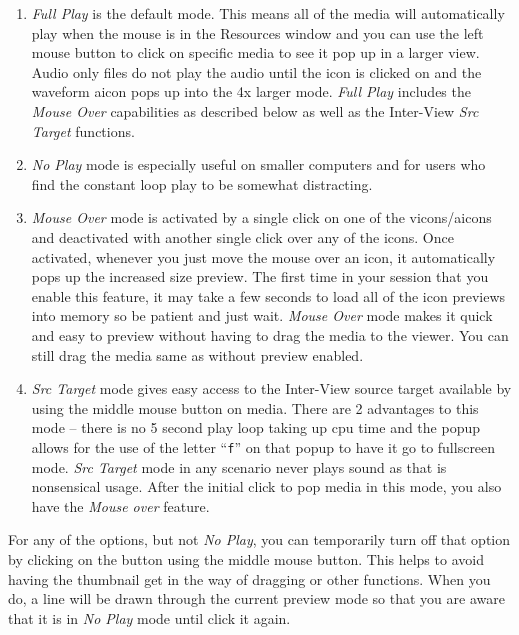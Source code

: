 \begin{enumerate}
    \item  \emph{Full Play} is the default mode.  
        This means all of the media will automatically play when the mouse is in the Resources window and you can use the left mouse button to click on specific media to see it pop up in a larger view.  
        Audio only files do not play the audio until the icon is clicked on and the waveform aicon pops up into the 4x larger mode. 
        \emph{Full Play} includes the \emph{Mouse Over} capabilities as described below as well as the Inter-View \emph{Src Target} functions.

	\item  \emph{No Play} mode is especially useful on smaller computers and for users who find the constant loop play to be somewhat distracting.

	\item  \emph{Mouse Over} mode is activated by a single click on one of the vicons/aicons and deactivated with another single click over any of the icons.  
    Once activated, whenever you just move the mouse over an icon, it automatically pops up the increased size preview.  
    The first time in your session that you enable this feature, it may take a few seconds to load all of the icon previews into memory so be patient and just wait.  
    \emph{Mouse Over} mode makes it quick and easy to preview without having to drag the media to the viewer.  
    You can still drag the media same as without preview enabled.  

	\item  \emph{Src Target} mode gives easy access to the Inter-View source target available by using the middle mouse button on media.  
    There are 2 advantages to this mode -- there is no 5 second play loop taking up cpu time and the popup allows for the use of the letter “\texttt{f}” on that popup to have it go to fullscreen mode.  
    \emph{Src Target} mode in any scenario never plays sound as that is nonsensical usage.  
    After the initial click to pop media in this mode, you also have the \emph{Mouse over} feature.
\end{enumerate}

For any of the options, but not \emph{No Play}, you can temporarily turn off that option by clicking on the button using the middle mouse button.  
This helps to avoid having the thumbnail get in the way of dragging or other functions.  
When you do, a line will be drawn through the current preview mode so that you are aware that it is in \emph{No Play} mode until click it again.

